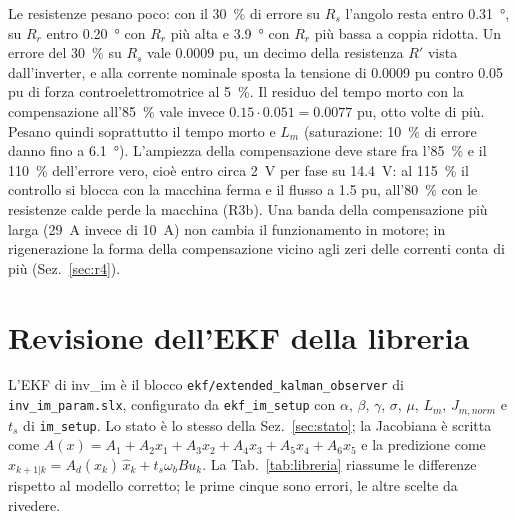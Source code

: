 \documentclass[10pt,a4paper]{scrartcl}
\newcommand{\code}[1]{\texttt{#1}}
\newcommand{\ts}{t_s}
\newcommand{\wb}{\omega_b}
\newcommand{\Rp}{R'}
\newcommand{\xh}{\hat{x}}
\begin{document}
\begin{onehalfspace}
Le resistenze pesano poco: con il \SI{30}{\percent} di errore su $R_s$ l'angolo resta entro \SI{0.31}{\degree}, su $R_r$ entro \SI{0.20}{\degree} con $R_r$ più alta e \SI{3.9}{\degree} con $R_r$ più bassa a coppia ridotta. Un errore del \SI{30}{\percent} su $R_s$ vale \num{0.0009} pu, un decimo della resistenza $\Rp$ vista dall'inverter, e alla corrente nominale sposta la tensione di \num{0.0009} pu contro \num{0.05} pu di forza controelettromotrice al \SI{5}{\percent}. Il residuo del tempo morto con la compensazione all'\SI{85}{\percent} vale invece $\num{0.15}\cdot\num{0.051} = \num{0.0077}$ pu, otto volte di più. Pesano quindi soprattutto il tempo morto e $L_m$ (saturazione: \SI{10}{\percent} di errore danno fino a \SI{6.1}{\degree}). L'ampiezza della compensazione deve stare fra l'\SI{85}{\percent} e il \SI{110}{\percent} dell'errore vero, cioè entro circa \SI{2}{V} per fase su \SI{14.4}{V}: al \SI{115}{\percent} il controllo si blocca con la macchina ferma e il flusso a \num{1.5} pu, all'\SI{80}{\percent} con le resistenze calde perde la macchina (R3b). Una banda della compensazione più larga (\SI{29}{A} invece di \SI{10}{A}) non cambia il funzionamento in motore; in rigenerazione la forma della compensazione vicino agli zeri delle correnti conta di più (Sez.~\ref{sec:r4}).

\clearpage
\section{Revisione dell'EKF della libreria}
\label{sec:libreria}

L'EKF di inv\_im è il blocco \code{ekf/extended\_kalman\_observer} di \code{inv\_im\_param.slx}, configurato da \code{ekf\_im\_setup} con $\alpha$, $\beta$, $\gamma$, $\sigma$, $\mu$, $L_m$, $J_{m,norm}$ e $\ts$ di \code{im\_setup}. Lo stato è lo stesso della Sez.~\ref{sec:stato}; la Jacobiana è scritta come $A(x) = A_1 + A_2 x_1 + A_3 x_2 + A_4 x_3 + A_5 x_4 + A_6 x_5$ e la predizione come $\xh_{k+1|k} = A_d(\xh_k)\,\xh_k + \ts\wb B u_k$. La Tab.~\ref{tab:libreria} riassume le differenze rispetto al modello corretto; le prime cinque sono errori, le altre scelte da rivedere.


\end{onehalfspace}
\end{document}
